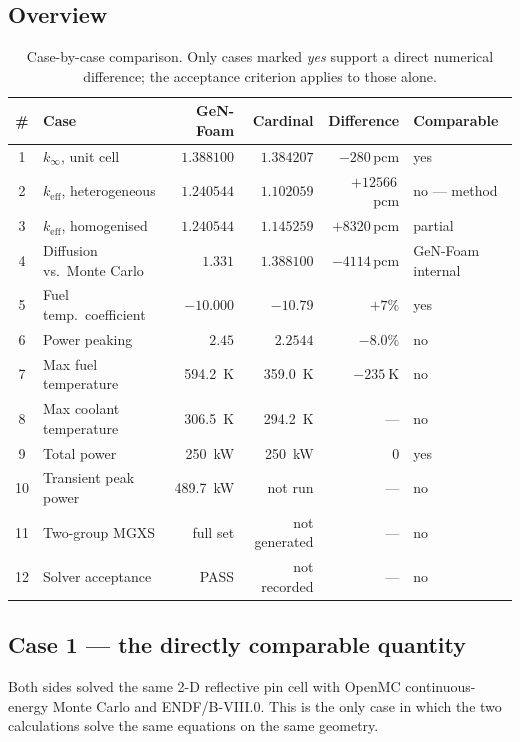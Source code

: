 \documentclass[11pt,a4paper]{article}
\newcommand{\keff}{\ensuremath{k_{\mathrm{eff}}}}
\newcommand{\kinf}{\ensuremath{k_{\infty}}}
\newcommand{\pcm}{\,pcm}
\begin{document}
\subsection{Overview}
\begin{table}[H]\centering\small
\caption{Case-by-case comparison. Only cases marked \emph{yes} support a direct numerical
difference; the acceptance criterion applies to those alone.}
\begin{tabular}{@{}clrrrl@{}}
\toprule
\textbf{\#} & \textbf{Case} & \textbf{GeN-Foam} & \textbf{Cardinal} & \textbf{Difference} & \textbf{Comparable}\\
\midrule
\rowcolor{rowbg}
1 & \kinf, unit cell & $1.388100$ & $1.384207$ & $-280$\pcm & yes\\
2 & \keff, heterogeneous & $1.240544$ & $1.102059$ & $+12566$\pcm & no --- method\\
3 & \keff, homogenised & $1.240544$ & $1.145259$ & $+8320$\pcm & partial\\
4 & Diffusion vs.\ Monte Carlo & $1.331$ & $1.388100$ & $-4114$\pcm & GeN-Foam internal\\
5 & Fuel temp.\ coefficient & $-10.000$ & $-10.79$ & $+7\%$ & yes\\
6 & Power peaking & $2.45$ & $2.2544$ & $-8.0\%$ & no\\
7 & Max fuel temperature & \SI{594.2}{\kelvin} & \SI{359.0}{\kelvin} & $-\SI{235}{\kelvin}$ & no\\
8 & Max coolant temperature & \SI{306.5}{\kelvin} & \SI{294.2}{\kelvin} & --- & no\\
9 & Total power & \SI{250}{\kilo\watt} & \SI{250}{\kilo\watt} & $0$ & yes\\
10 & Transient peak power & \SI{489.7}{\kilo\watt} & not run & --- & no\\
11 & Two-group MGXS & full set & not generated & --- & no\\
12 & Solver acceptance & PASS & not recorded & --- & no\\
\bottomrule
\end{tabular}
\end{table}

\subsection{Case 1 --- the directly comparable quantity}
Both sides solved the same 2-D reflective pin cell with OpenMC continuous-energy Monte Carlo
and ENDF/B-VIII.0. This is the only case in which the two calculations solve the same
equations on the same geometry.
\end{document}
